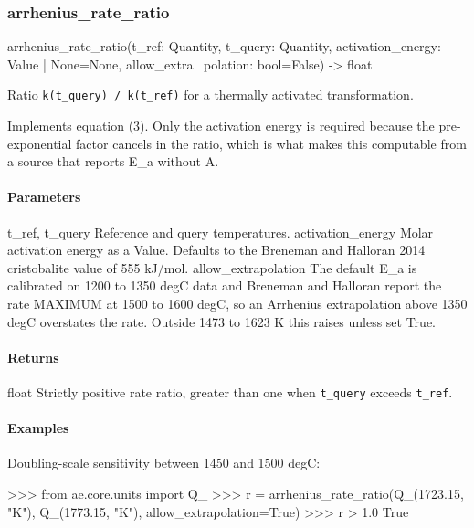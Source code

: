 \documentclass[10pt,a4paper,twoside]{report}
\begin{document}
\subsubsection*{arrhenius\_rate\_ratio}

\begin{verbatimsmall}
arrhenius_rate_ratio(t_ref: Quantity, t_query: Quantity, activation_energy: Value | None=None, allow_extra
    \ polation: bool=False) -> float
\end{verbatimsmall}

Ratio \texttt{k(t\_query) / k(t\_ref)} for a thermally activated transformation.

Implements equation (3). Only the activation energy is required because the pre-exponential factor cancels in the ratio, which is what makes this computable from a source that reports E\_a without A.

\paragraph*{Parameters}

t\_ref, t\_query Reference and query temperatures. activation\_energy Molar activation energy as a Value. Defaults to the Breneman and Halloran 2014 cristobalite value of 555 kJ/mol. allow\_extrapolation The default E\_a is calibrated on 1200 to 1350 degC data and Breneman and Halloran report the rate MAXIMUM at 1500 to 1600 degC, so an Arrhenius extrapolation above 1350 degC overstates the rate. Outside 1473 to 1623 K this raises unless set True.

\paragraph*{Returns}

float Strictly positive rate ratio, greater than one when \texttt{t\_query} exceeds \texttt{t\_ref}.

\paragraph*{Examples}

Doubling-scale sensitivity between 1450 and 1500 degC:

\begin{doctestblock}
>>> from ae.core.units import Q_
>>> r = arrhenius_rate_ratio(Q_(1723.15, "K"), Q_(1773.15, "K"), allow_extrapolation=True)
>>> r > 1.0
True
\end{doctestblock}
\end{document}
